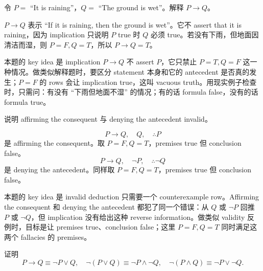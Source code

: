 \begin{exerciseblock}
令 \(P=\) ``It is raining''，\(Q=\) ``The ground is wet''。解释 \(P\to Q\)。
\end{exerciseblock}

\begin{solution}
\(P\to Q\) 表示 ``If it is raining, then the ground is wet''。它不 assert that it is raining，因为 implication 只说明 \(P\) true 时 \(Q\) 必须 true。若没有下雨，但地面因清洁而湿，则 \(P=F,Q=T\)，所以 \(P\to Q=T\)。
\end{solution}

\begin{explanation}
本题的 key idea 是 implication \(P\to Q\) 不 assert \(P\)，它只禁止 \(P=T,Q=F\) 这一种情况。做类似解释题时，要区分 statement 本身和它的 antecedent 是否真的发生；\(P=F\) 的 rows 会让 implication true，这叫 vacuous truth。用现实例子检查时，只需问：有没有 ``下雨但地面不湿'' 的情况；有的话 formula false，没有的话 formula true。
\end{explanation}

\begin{exerciseblock}
说明 affirming the consequent 与 denying the antecedent invalid。
\end{exerciseblock}

\begin{solution}
\[
P\to Q,\quad Q,\quad \therefore P
\]
是 affirming the consequent。取 \(P=F,Q=T\)，premises true 但 conclusion false。
\[
P\to Q,\quad \lnot P,\quad \therefore \lnot Q
\]
是 denying the antecedent。同样取 \(P=F,Q=T\)，premises true 但 conclusion false。
\end{solution}

\begin{explanation}
本题的 key idea 是 invalid deduction 只需要一个 counterexample row。Affirming the consequent 和 denying the antecedent 都犯了同一个错误：从 \(Q\) 或 \(\lnot P\) 回推 \(P\) 或 \(\lnot Q\)，但 implication 没有给出这种 reverse information。做类似 validity 反例时，目标是让 premises true、conclusion false；这里 \(P=F,Q=T\) 同时满足这两个 fallacies 的 premises。
\end{explanation}

\begin{exerciseblock}
证明
\[
P\to Q\equiv\lnot P\lor Q,\quad
\lnot(P\lor Q)\equiv\lnot P\land\lnot Q,\quad
\lnot(P\land Q)\equiv\lnot P\lor\lnot Q.
\]
\end{exerciseblock}

